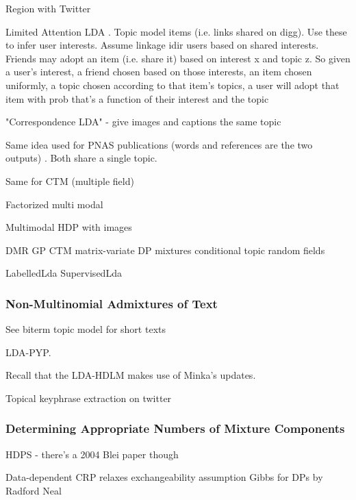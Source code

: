 \documentclass[10pt,fleqn]{article}
\begin{document}
Region with Twitter \cite{Eisenstein2010}


Limited Attention LDA \cite{Kang2013}. Topic model items (i.e. links shared on digg). Use these to infer user interests. Assume linkage idir users based on shared interests. Friends may adopt an item (i.e. share it) based on interest x and topic z. So given a user's interest, a friend chosen based on those interests, an item chosen uniformly, a topic chosen according to that item's topics, a user will adopt that item with prob that's a function of their interest and the topic


"Correspondence LDA" - give images and captions the same topic \cite{Blei2003}

Same idea used for PNAS publications (words and references are the two outputs) \cite{Erosheva2004}. Both share a single topic.

Same for CTM (multiple field) \cite{Salomatin2009}

Factorized multi modal \cite{Virtanen2012a}

Multimodal HDP with images \cite{Yakhnenko2009}

DMR \cite{Mimno2008}
GP CTM \cite{Hennig2012}
matrix-variate DP mixtures\cite{Zhang2010}
conditional topic random fields\cite{Zhu2010}


LabelledLda\cite{Ramage2009}
SupervisedLda\cite{Rubin2011}


\subsubsection{Non-Multinomial Admixtures of Text}
See biterm topic model for short texts \cite{Yan2013}

LDA-PYP\cite{Lindsey2012}. 

Recall that the LDA-HDLM\cite{Wallach2006} makes use of Minka's\cite{Minka2000} updates.

Topical keyphrase extraction on twitter\cite{Zhao2011a}


\subsubsection{Determining Appropriate Numbers of Mixture Components}
HDPS\cite{Teh2006b} - there's a 2004 Blei paper though

Data-dependent CRP relaxes exchangeability assumption\cite{Kim2011}
Gibbs for DPs by Radford Neal\cite{Neal2000}
\end{document}

